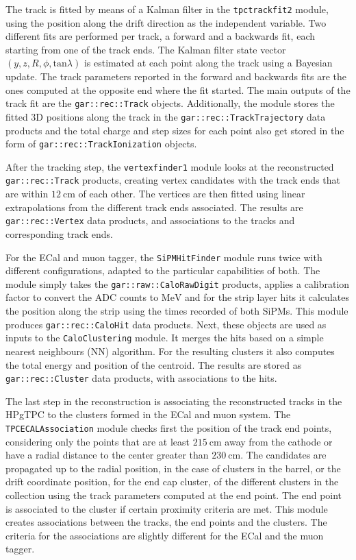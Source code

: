 The track is fitted by means of a Kalman filter in the \texttt{tpctrackfit2} module, using the position along the drift direction as the independent variable. Two different fits are performed per track, a forward and a backwards fit, each starting from one of the track ends. The Kalman filter state vector $(y,z,R,\phi,\mathrm{tan}\lambda)$ is estimated at each point along the track using a Bayesian update. The track parameters reported in the forward and backwards fits are the ones computed at the opposite end where the fit started. The main outputs of the track fit are the \texttt{gar::rec::Track} objects. Additionally, the module stores the fitted 3D positions along the track in the \texttt{gar::rec::TrackTrajectory} data products and the total charge and step sizes for each point also get stored in the form of \texttt{gar::rec::TrackIonization} objects.

After the tracking step, the \texttt{vertexfinder1} module looks at the reconstructed \texttt{gar::rec::Track} products, creating vertex candidates with the track ends that are within $12~\mathrm{cm}$ of each other. The vertices are then fitted using linear extrapolations from the different track ends associated. The results are \texttt{gar::rec::Vertex} data products, and associations to the tracks and corresponding track ends.

For the ECal and muon tagger, the \texttt{SiPMHitFinder} module runs twice with different configurations, adapted to the particular capabilities of both. The module simply takes the \texttt{gar::raw::CaloRawDigit} products, applies a calibration factor to convert the ADC counts to $\mathrm{MeV}$ and for the strip layer hits it calculates the position along the strip using the times recorded of both SiPMs. This module produces \texttt{gar::rec::CaloHit} data products. Next, these objects are used as inputs to the \texttt{CaloClustering} module. It merges the hits based on a simple nearest neighbours (NN) algorithm. For the resulting clusters it also computes the total energy and position of the centroid. The results are stored as \texttt{gar::rec::Cluster} data products, with associations to the hits.

The last step in the reconstruction is associating the reconstructed tracks in the HPgTPC to the clusters formed in the ECal and muon system. The \texttt{TPCECALAssociation} module checks first the position of the track end points, considering only the points that are at least $215~\mathrm{cm}$ away from the cathode or have a radial distance to the center greater than $230~\mathrm{cm}$. The candidates are propagated up to the radial position, in the case of clusters in the barrel, or the drift coordinate position, for the end cap cluster, of the different clusters in the collection using the track parameters computed at the end point. The end point is associated to the cluster if certain proximity criteria are met. This module creates associations between the tracks, the end points and the clusters. The criteria for the associations are slightly different for the ECal and the muon tagger.
